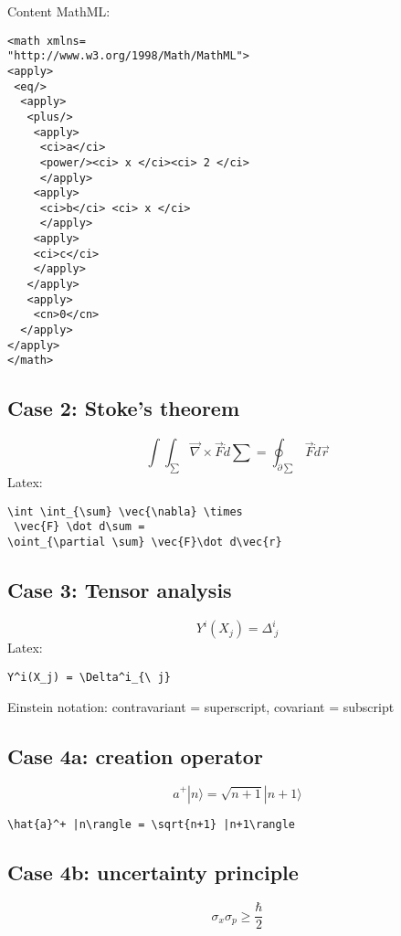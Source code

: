 \documentclass{article}
\begin{document}
\begin{multicols}{2}
Content MathML:
\begin{verbatim}
<math xmlns=
"http://www.w3.org/1998/Math/MathML">
<apply>
 <eq/>
  <apply>
   <plus/>
    <apply>
     <ci>a</ci> 
     <power/><ci> x </ci><ci> 2 </ci>
     </apply>
    <apply>
     <ci>b</ci> <ci> x </ci>                    
     </apply>
    <apply>
    <ci>c</ci>                                 
    </apply>
   </apply>
   <apply>
    <cn>0</cn>
  </apply>
</apply>
</math>
\end{verbatim}

\subsection{Case 2: Stoke's theorem}
\begin{equation}
\int \int_{\sum} \vec{\nabla} \times \vec{F} \dot d\sum = \oint_{\partial \sum} \vec{F}\dot d\vec{r}
\label{eq:stokes_case2}
\end{equation}
Latex:
\begin{verbatim}
\int \int_{\sum} \vec{\nabla} \times
 \vec{F} \dot d\sum = 
\oint_{\partial \sum} \vec{F}\dot d\vec{r}
\end{verbatim}

\subsection{Case 3: Tensor analysis}
\begin{equation}
Y^i(X_j) = \Delta^i_{\ j}
\end{equation}
Latex: 
\begin{verbatim}
Y^i(X_j) = \Delta^i_{\ j}
\end{verbatim}

Einstein notation: contravariant = superscript, covariant = subscript

\subsection{Case 4a: creation operator}
\begin{equation}
\hat{a}^+ |n\rangle = \sqrt{n+1} |n+1\rangle
\end{equation}

\begin{verbatim}
\hat{a}^+ |n\rangle = \sqrt{n+1} |n+1\rangle
\end{verbatim}

\subsection{Case 4b: uncertainty principle}
\begin{equation}
\sigma_x \sigma_p \geq \frac{\hbar}{2}
\end{equation}


\end{multicols}
\end{document}
